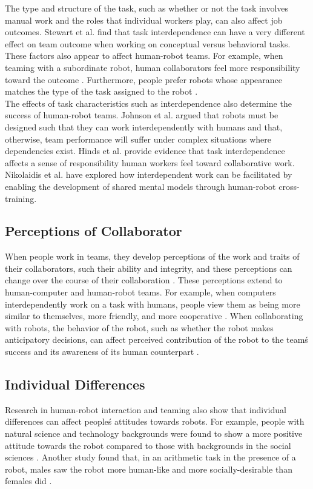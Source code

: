        The type and structure of the task, such as whether or not the task involves manual work and the roles that individual workers play, can also affect job outcomes. Stewart et al. \cite{stewart2000team} find that task interdependence can have a very different effect on team outcome when working on conceptual versus behavioral tasks. These factors also appear to affect human-robot teams. For example, when teaming with a subordinate robot, human collaborators feel more responsibility toward the outcome \cite{hinds2004whose}. Furthermore, people prefer robots whose appearance matches the type of the task assigned to the robot \cite{goetz2003matching}.\\
       The effects of task characteristics such as interdependence also determine the success of human-robot teams. Johnson et al. \cite{johnson2012autonomy} argued that robots must be designed such that they can work interdependently with humans and that, otherwise, team performance will suffer under complex situations where dependencies exist. Hinds et al. \cite{hinds2004whose} provide evidence that task interdependence affects a sense of responsibility human workers feel toward collaborative work. Nikolaidis et al. \cite{nikolaidis2012human, nikolaidis2013human} have explored how interdependent work can be facilitated  by enabling the development of shared mental models through human-robot cross-training. 
\subsection{Perceptions of Collaborator}
       When people work in teams, they develop perceptions of the work and traits of their collaborators, such their ability and integrity, and these perceptions can change over the course of their collaboration \cite{jarvenpaa1994global}. These perceptions extend to human-computer and human-robot teams. For example, when computers interdependently work on a task with humans, people view them as being more similar to themselves, more friendly, and more cooperative \cite{nass1996can}. When collaborating with robots, the behavior of the robot, such as whether the robot makes anticipatory decisions, can affect perceived contribution of the robot to the team\' s success \cite{hoffman2007effects} and its awareness of its human counterpart \cite{huang2015adaptive}.
\subsection{Individual Differences}
       Research in human-robot interaction and teaming also show that individual differences can affect people\' s attitudes towards robots. For example, people with natural science and technology backgrounds were found to show a more positive attitude towards the robot compared to those with backgrounds in the social sciences \cite{nomura2011exploring}. Another study found that, in an arithmetic task in the presence of a robot, males saw the robot more human-like and more socially-desirable than females did \cite{schermerhorn2008robot}.